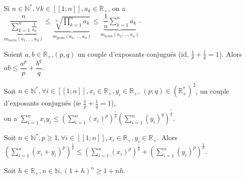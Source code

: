 \documentclass[landscape,twocolumn]{article}
\begin{document}
\begin{ine}
\begin{center}
Si $n \in \mathbb{N}^*, \forall k \in [\![1;n]\!], a_k \in \mathbb{R}_+$, on a $\underbrace{\dfrac{n}{\sum \limits_{k=1}^n \frac{1}{a_k}}} \limits_{m_{harm}(a_1,...,a_n)} \leqslant  \underbrace{\sqrt[n]{\prod \limits_{k=1}^n a_k}} \limits_{ m_{geom}(a_1,...,a_n)} \leqslant \underbrace{\dfrac{1}{n}\sum \limits_{k=1}^n a_k} \limits_{m_{arith}(a_1,...,a_n)}$.
\end{center}
\end{ine}

\begin{ine}
\begin{center}
Soient $a,b \in \mathbb{R}_+$,$(p,q)$ un couple d'exposants conjugués (id, $\frac{1}{p}+\frac{1}{q}=1$).
Alors $ab \leqslant \dfrac{a^p}{p}+\dfrac{b^q}{q}$. 
\end{center}
\end{ine}

\begin{ine}
\begin{center}
Soit $n \in \mathbb{N}^*, \forall i \in [\![1;n]\!], x_i \in \mathbb{R}_+, y_i \in \mathbb{R}_+$. $(p;q) \in (\mathbb{R}_+^*)^2$, un couple d'exposants conjugués (ie $\frac{1}{p}+\frac{1}{q}=1$), \\
on a $\sum \limits_{i=1}^n x_iy_i \leqslant  \left( \sum \limits_{i=1}^n (x_i)^p \right)^\frac{^1}{p}  \left(\sum \limits_{i=1}^n (y_i)^q \right)^\frac{^1}{q}$.
\end{center}
\end{ine}

\begin{ine}
\begin{center}
Soit $n \in \mathbb{N}^*, p \geqslant 1, \forall i \in [\![1;n]\!], x_i \in \mathbb{R}_+, y_i \in \mathbb{R}_+$. 
Alors $ \left(\sum \limits_{i=1}^n (x_i+y_i)^p \right)^{\frac{1}{p}} \leqslant  \left(\sum \limits_{i=1}^n (x_i)^p \right)^{\frac{1}{p}}+\left(\sum \limits_{i=1}^n (y_i)^p \right)^{\frac{1}{p}}$.
\end{center}
\end{ine}

\begin{ine}
\begin{center}
Soit $h \in \mathbb{R}_+, n \in \mathbb{N}, (1+h)^n \geqslant 1+nh$.
\end{center}
\end{ine}
\end{document}
